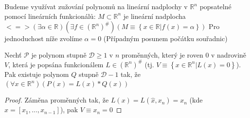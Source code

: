 \documentclass[../main.tex]{subfiles}
\begin{document}
\begin{remark}
    Budeme využívat zužování polynomů na lineární nadplochy v $\mathbb{R}^n$ popsatelné pomocí lineárních funkcionálů: \break
    $M \subset \mathbb{R}^n$ je lineární nadplocha $<=> (\exists \alpha\in \mathbb{R})(\exists f \in (\mathbb{R}^n)^\#)(M\equiv \left\{ x\in\mathbb{R} | f(x) = \alpha    \right\})$ \break
    Pro jednoduchost níže zvolíme $\alpha = 0$ (Případným posunem počátku souřadnic)
\end{remark}

\begin{lemma}[O redukci]
    Nechť $\mathcal{P}$ je polynom stupně $\mathcal{D} \geq 1$ v $n$ proměnných, který je roven $0$ v nadrovině $V$, která je popsána funkcionálem $L\in(\mathbb{R}^n)^\#$ (tj. $V\equiv \left\{x\in\mathbb{R}^n| L(x)= 0\right\}$).
    Pak existuje polynom $Q$ stupně $\mathcal{D} - 1$ tak, že $(\forall x\in\mathbb{R}^n)(P(x) = L(x)*Q(x))$    
\end{lemma}

\begin{proof}
    Záměna proměnných tak, že $L(x) = L(\hat{x}, x_n) = x_n$ (kde $\hat{x} = [x_1,...,x_{n-1}]$), pak $V\equiv x_n = 0$





\end{proof}
\end{document}
